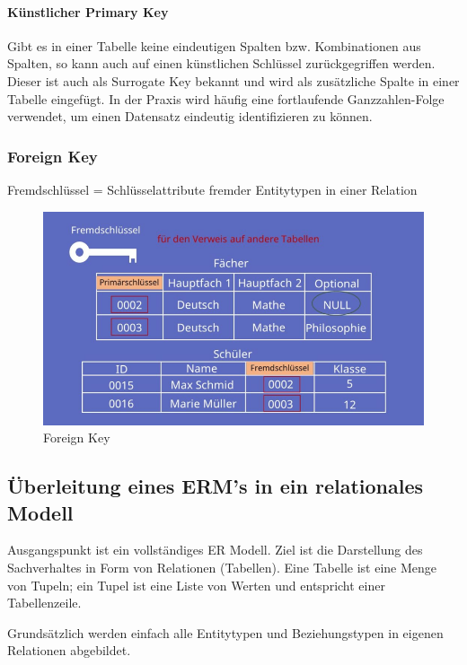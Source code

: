 \paragraph{Künstlicher Primary Key}
Gibt es in einer Tabelle keine eindeutigen Spalten bzw. Kombinationen aus Spalten, so kann auch auf einen künstlichen Schlüssel zurückgegriffen werden. Dieser ist auch als Surrogate Key bekannt und wird als zusätzliche Spalte in einer Tabelle eingefügt. In der Praxis wird häufig eine fortlaufende Ganzzahlen-Folge verwendet, um einen Datensatz eindeutig identifizieren zu können.

\subsubsection{Foreign Key}

Fremdschlüssel = Schlüsselattribute fremder Entitytypen in einer Relation

\begin{figure}[H]
    \centering
    \includegraphics[width=.3\textwidth]{Content/images/modellierung/foreignkey.png}
    \caption{Foreign Key}
    \label{fig:modellierung:foreignkey}
\end{figure}

\subsection{Überleitung eines ERM’s in ein relationales Modell}

Ausgangspunkt ist ein vollständiges ER Modell. Ziel ist die Darstellung des Sachverhaltes in Form von Relationen (Tabellen). Eine Tabelle ist eine Menge von Tupeln; ein Tupel ist eine Liste von Werten und entspricht einer Tabellenzeile.

Grundsätzlich werden einfach alle Entitytypen und Beziehungstypen in eigenen Relationen abgebildet.


